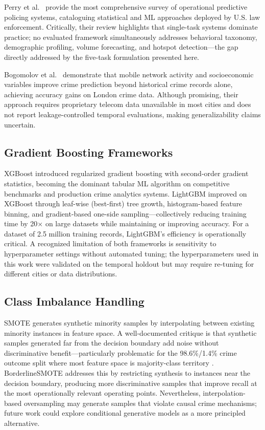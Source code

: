 \documentclass[conference]{IEEEtran}
\begin{document}
Perry et al.\ \cite{perry2013} provide the most comprehensive survey of operational predictive policing systems, cataloguing statistical and ML approaches deployed by U.S. law enforcement. Critically, their review highlights that single-task systems dominate practice; no evaluated framework simultaneously addresses behavioral taxonomy, demographic profiling, volume forecasting, and hotspot detection—the gap directly addressed by the five-task formulation presented here.

Bogomolov et al.\ \cite{bogomolov2014} demonstrate that mobile network activity and socioeconomic variables improve crime prediction beyond historical crime records alone, achieving accuracy gains on London crime data. Although promising, their approach requires proprietary telecom data unavailable in most cities and does not report leakage-controlled temporal evaluations, making generalizability claims uncertain.

\subsection{Gradient Boosting Frameworks}
XGBoost \cite{chen2016} introduced regularized gradient boosting with second-order gradient statistics, becoming the dominant tabular ML algorithm on competitive benchmarks and production crime analytics systems. LightGBM \cite{ke2017} improved on XGBoost through leaf-wise (best-first) tree growth, histogram-based feature binning, and gradient-based one-side sampling—collectively reducing training time by 20$\times$ on large datasets while maintaining or improving accuracy. For a dataset of 2.5 million training records, LightGBM's efficiency is operationally critical. A recognized limitation of both frameworks is sensitivity to hyperparameter settings without automated tuning; the hyperparameters used in this work were validated on the temporal holdout but may require re-tuning for different cities or data distributions.

\subsection{Class Imbalance Handling}
SMOTE \cite{chawla2002} generates synthetic minority samples by interpolating between existing minority instances in feature space. A well-documented critique is that synthetic samples generated far from the decision boundary add noise without discriminative benefit—particularly problematic for the 98.6\%/1.4\% crime outcome split where most feature space is majority-class territory \cite{he2009}. BorderlineSMOTE \cite{han2005} addresses this by restricting synthesis to instances near the decision boundary, producing more discriminative samples that improve recall at the most operationally relevant operating points. Nevertheless, interpolation-based oversampling may generate samples that violate causal crime mechanisms; future work could explore conditional generative models as a more principled alternative.
\end{document}
